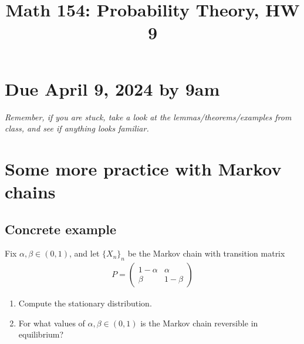 \documentclass[12pt,reqno]{amsart}
\title{\Large Math 154: Probability Theory, HW 9\vspace{-0.1cm}}
\theoremstyle{definition}
\theoremstyle{remark}
\numberwithin{equation}{section}
\newenvironment{nouppercase}{%
  \let\uppercase\relax%
  \renewcommand{\uppercasenonmath}[1]{}}{}
\begin{document}
\begin{nouppercase}
\maketitle
\end{nouppercase}
\section*{Due April 9, 2024 by 9am}
\emph{Remember, if you are stuck, take a look at the lemmas/theorems/examples from class, and see if anything looks familiar.}
\section{Some more practice with Markov chains}
\subsection{Concrete example}
Fix $\alpha,\beta\in(0,1)$, and let $\{X_{n}\}_{n}$ be the Markov chain with transition matrix
%
\begin{align*}
P=\begin{pmatrix}1-\alpha&\alpha\\\beta&1-\beta\end{pmatrix}
\end{align*}
%
\begin{enumerate}
\item Compute the stationary distribution.
\item For what values of $\alpha,\beta\in(0,1)$ is the Markov chain reversible in equilibrium?
\end{enumerate}
\end{document}
